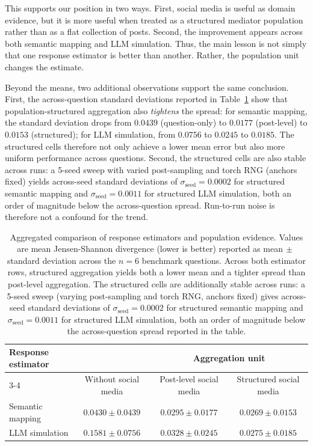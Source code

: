 \documentclass{article}
\begin{document}
This supports our position in two ways.
First, social media is useful as domain evidence, but it is more useful when treated as a
structured mediator population rather than as a flat collection of posts.
Second, the improvement appears across both semantic mapping and LLM simulation.
Thus, the main lesson is not simply that one response estimator is better than another.
Rather, the population unit changes the estimate.

Beyond the means, two additional observations support the same conclusion.
First, the across-question standard deviations reported in Table~\ref{tab:2by2_results}
show that population-structured aggregation also \emph{tightens} the spread:
for semantic mapping, the standard deviation drops from $0.0439$ (question-only) to
$0.0177$ (post-level) to $0.0153$ (structured); for LLM simulation, from $0.0756$ to
$0.0245$ to $0.0185$.
The structured cells therefore not only achieve a lower mean error but also more uniform
performance across questions.
Second, the structured cells are also stable across runs: a 5-seed sweep with varied
post-sampling and torch RNG (anchors fixed) yields across-seed standard deviations of
$\sigma_\text{seed}=0.0002$ for structured semantic mapping and $\sigma_\text{seed}=0.0011$
for structured LLM simulation, both an order of magnitude below the across-question
spread. Run-to-run noise is therefore not a confound for the trend.

\begin{table}[htb!]
\centering
\small
\begin{tabular}{lccc}
\toprule
\multirow{2}{*}{Response estimator} &
& \multicolumn{2}{c}{Aggregation unit} \\
\cmidrule(lr){3-4}
& Without social media & Post-level social media & Structured social media \\
\midrule
Semantic mapping & $0.0430 \pm 0.0439$ & $0.0295 \pm 0.0177$ & $\mathbf{0.0269 \pm 0.0153}$ \\
LLM simulation   & $0.1581 \pm 0.0756$ & $0.0328 \pm 0.0245$ & $\mathbf{0.0275 \pm 0.0185}$ \\
\bottomrule
\end{tabular}
\caption{Aggregated comparison of response estimators and population evidence. Values are mean Jensen-Shannon divergence (lower is better) reported as mean$\,\pm\,$standard deviation across the $n=6$ benchmark questions. Across both estimator rows, structured aggregation yields both a lower mean and a tighter spread than post-level aggregation. The structured cells are additionally stable across runs: a 5-seed sweep (varying post-sampling and torch RNG, anchors fixed) gives across-seed standard deviations of $\sigma_\text{seed}=0.0002$ for structured semantic mapping and $\sigma_\text{seed}=0.0011$ for structured LLM simulation, both an order of magnitude below the across-question spread reported in the table.}
\label{tab:2by2_results}
\end{table}
\end{document}
